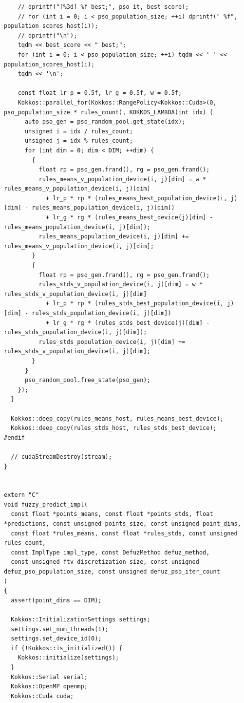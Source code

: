 \begin{verbatim}
    // dprintf("[%3d] %f best;", pso_it, best_score);
    // for (int i = 0; i < pso_population_size; ++i) dprintf(" %f", population_scores_host(i));
    // dprintf("\n");
    tqdm << best_score << " best;";
    for (int i = 0; i < pso_population_size; ++i) tqdm << ' ' << population_scores_host(i);
    tqdm << '\n';

    const float lr_p = 0.5f, lr_g = 0.5f, w = 0.5f;
    Kokkos::parallel_for(Kokkos::RangePolicy<Kokkos::Cuda>(0, pso_population_size * rules_count), KOKKOS_LAMBDA(int idx) {
      auto pso_gen = pso_random_pool.get_state(idx);
      unsigned i = idx / rules_count;
      unsigned j = idx % rules_count;
      for (int dim = 0; dim < DIM; ++dim) {
        {
          float rp = pso_gen.frand(), rg = pso_gen.frand();
          rules_means_v_population_device(i, j)[dim] = w * rules_means_v_population_device(i, j)[dim]
            + lr_p * rp * (rules_means_best_population_device(i, j)[dim] - rules_means_population_device(i, j)[dim])
            + lr_g * rg * (rules_means_best_device(j)[dim] - rules_means_population_device(i, j)[dim]);
          rules_means_population_device(i, j)[dim] += rules_means_v_population_device(i, j)[dim];
        }
        {
          float rp = pso_gen.frand(), rg = pso_gen.frand();
          rules_stds_v_population_device(i, j)[dim] = w * rules_stds_v_population_device(i, j)[dim]
            + lr_p * rp * (rules_stds_best_population_device(i, j)[dim] - rules_stds_population_device(i, j)[dim])
            + lr_g * rg * (rules_stds_best_device(j)[dim] - rules_stds_population_device(i, j)[dim]);
          rules_stds_population_device(i, j)[dim] += rules_stds_v_population_device(i, j)[dim];
        }
      }
      pso_random_pool.free_state(pso_gen);
    });
  }

  Kokkos::deep_copy(rules_means_host, rules_means_best_device);
  Kokkos::deep_copy(rules_stds_host, rules_stds_best_device);
#endif

  // cudaStreamDestroy(stream);
}


extern "C"
void fuzzy_predict_impl(
  const float *points_means, const float *points_stds, float *predictions, const unsigned points_size, const unsigned point_dims,
  const float *rules_means, const float *rules_stds, const unsigned rules_count,
  const ImplType impl_type, const DefuzMethod defuz_method,
  const unsigned ftv_discretization_size, const unsigned defuz_pso_population_size, const unsigned defuz_pso_iter_count
)
{
  assert(point_dims == DIM);

  Kokkos::InitializationSettings settings;
  settings.set_num_threads(1);
  settings.set_device_id(0);
  if (!Kokkos::is_initialized()) {
    Kokkos::initialize(settings);
  }
  Kokkos::Serial serial;
  Kokkos::OpenMP openmp;
  Kokkos::Cuda cuda;


\end{verbatim}
